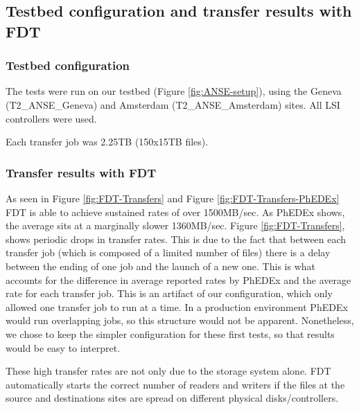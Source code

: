 \subsection{Testbed configuration and transfer results with FDT}

\subsubsection{Testbed configuration}

The tests were run on our testbed (Figure \ref{fig:ANSE-setup}), using the Geneva
(T2\_ANSE\_Geneva) and Amsterdam (T2\_ANSE\_Amsterdam) sites. All LSI controllers
were used.

Each transfer job was 2.25TB (150x15TB files).

\subsubsection{Transfer results with FDT}

As seen in Figure \ref{fig:FDT-Transfers} and Figure \ref{fig:FDT-Transfers-PhEDEx}
FDT is able to achieve sustained rates of over 1500MB/sec. As PhEDEx shows,
the average sits at a marginally slower 1360MB/sec. Figure \ref{fig:FDT-Transfers}, shows periodic drops in transfer rates.
This is due to the fact that between each transfer job (which is composed of a limited
number of files) there is a delay between the ending of one job and the launch of
a new one. This is what accounts for the difference in average reported rates by PhEDEx
and the average rate for each transfer job. This is an artifact of our configuration, which only allowed one
transfer job to run at a time. In a production environment PhEDEx would run overlapping jobs, so this structure would not be apparent. Nonetheless, we chose to keep the simpler configuration for these first tests, so that results would be easy to interpret.

These high transfer rates are not only due to the storage system alone. FDT
automatically starts the correct number of readers and writers if the files at 
the source and destinations sites are spread on different physical disks/controllers.

